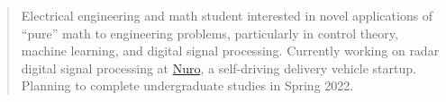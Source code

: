 \documentclass[10pt,a4paper,ragged2e,withhyper]{altacv}
\begin{document}


\makecvheader


\begin{quote}
Electrical engineering and math student interested in novel applications of ``pure'' math to engineering problems, particularly in control theory, machine learning, and digital signal processing. Currently working on radar digital signal processing at \href{https://nuro.ai/}{Nuro}, a self-driving delivery vehicle startup. Planning to complete undergraduate studies in Spring 2022.
\end{quote}

\vspace{0.25cm}
\end{document}

